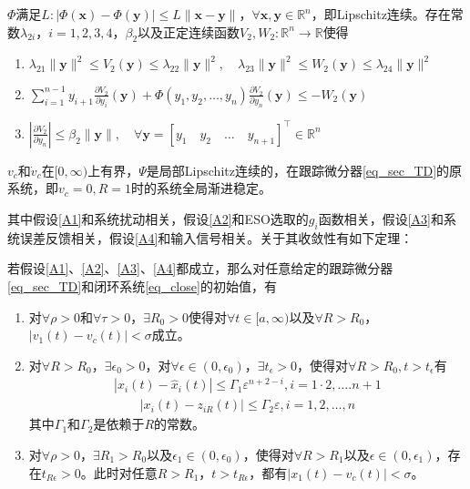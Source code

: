 \begin{assumption}
$ \Phi $满足$L:|\Phi(\bm{x})-\Phi(\bm{y})| \leq L\|\bm{x}-\bm{y}\|$，$ \forall \bm{x},\bm{y} \in \mathbb{R}^{n} $，即Lipschitz连续。存在常数$\lambda_{2 i}$，$i=1,2,3,4$，$\beta_{2}$以及正定连续函数$V_2, W_2: \mathbb{R}^{n} \rightarrow \mathbb{R}$使得
\begin{enumerate}
	\item $ \lambda_{21}\|\bm{y}\|^{2} \leq V_{2}(\bm{y}) \leq \lambda_{22}\|\bm{y}\|^{2}, \quad \lambda_{23}\|\bm{y}\|^{2} \leq W_{2}(\bm{y}) \leq \lambda_{24}\|\bm{y}\|^{2} $
	\item $ \sum_{i=1}^{n-1} y_{i+1} \frac{\partial V_{2}}{\partial y_{i}}(\bm{y})+\Phi\left(y_{1}, y_{2}, \ldots, y_{n}\right) \frac{\partial V_{2}}{\partial y_{n}}(\bm{y}) \leq-W_{2}(\bm{y}) $
	\item $|\frac{\partial V_{2}}{\partial y_{n}}| \leq \beta_{2}\|\bm{y}\|, \quad \forall \bm{y}=[y_{1} \quad y_{2} \quad \ldots \quad y_{n+1}]^\top \in \mathbb{R}^{n} $	
\end{enumerate}	\label{A3}
\end{assumption}

\begin{assumption}
$ v_c $和$ \dot{v}_c $在$ [0,\infty) $上有界，$ \Psi $是局部Lipschitz连续的，在跟踪微分器\eqref{eq_sec_TD}的原系统，即$ v_c=0,R=1 $时的系统全局渐进稳定。\label{A4}
\end{assumption}
其中假设\ref{A1}和系统扰动相关，假设\ref{A2}和ESO选取的$ g_i $函数相关，假设\ref{A3}和系统误差反馈相关，假设\ref{A4}和输入信号相关。关于其收敛性有如下定理\cite{Guo_2012a}：
\begin{theorem}
	若假设\ref{A1}、\ref{A2}、\ref{A3}、\ref{A4}都成立，那么对任意给定的跟踪微分器\eqref{eq_sec_TD}和闭环系统\ref{eq_close}的初始值，有
	\begin{enumerate}
		\item 对$ \forall \rho >0 $和$ \forall \tau >0 $，$ \exists R_0>0 $使得对$\forall t \in [a,\infty)$以及$ \forall R>R_0 $，$\left|v_{1}(t)-{v_c}(t)\right|<\sigma $成立。
		\item 对$ \forall R>R_0 $，$ \exists \epsilon_0>0 $，对$\forall \epsilon \in (0,\epsilon_0)$，$ \exists t_\epsilon >0 $，使得对$ \forall R>R_0 , t>t_\epsilon $有
		\begin{align}\left|x_{i}(t)-\hat{x}_{i}(t)\right| \leq \Gamma_{1} \varepsilon^{n+2-i}, i=1 \cdot 2, \ldots . n+1\end{align}
		\begin{align}\left|x_{i}(t)-z_{i R}(t)\right| \leq \Gamma_{2} \varepsilon, i=1,2, \ldots, n\end{align}
		其中$ \Gamma_{1} $和$ \Gamma_{2} $是依赖于$ R $的常数。
		\item 对$ \forall \rho >0 $，$\exists R_1>R_0$以及$ \epsilon_1 \in (0,\epsilon_0)$，使得对$  \forall R>R_1 $以及$ \epsilon \in (0,\epsilon_1) $，存在$ t_{R\epsilon}>0 $。此时对任意$ R>R_1 $，$ t> t_{R\epsilon} $，都有$\left|x_{1}(t)-v_c(t)\right|<\sigma$。
	\end{enumerate}	\label{the_close}
\end{theorem}
